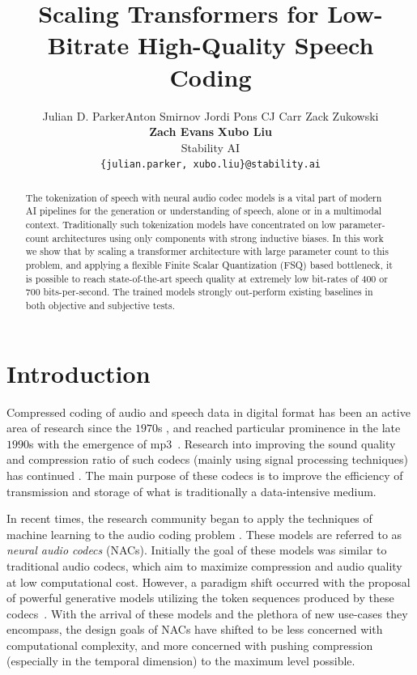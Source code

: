 \documentclass{article} %
\title{Scaling Transformers for Low-Bitrate High-Quality Speech Coding} %
\author{Julian D. Parker\footnotemark[1] \quad Anton Smirnov \quad Jordi Pons \quad CJ Carr \quad Zack Zukowski\\
\textbf{Zach Evans} \quad \textbf{Xubo Liu\footnotemark[1]} \\
Stability AI\\
\texttt{\{julian.parker, xubo.liu\}@stability.ai}\\}
\begin{document}
\maketitle
\renewcommand{\thefootnote}{\fnsymbol{footnote}}
\renewcommand{\thefootnote}{\arabic{footnote}} %
\setcounter{footnote}{0} %
\begin{abstract}
The tokenization of speech with neural audio codec models is a vital part of modern AI pipelines for the generation or understanding of speech, alone or in a multimodal context. Traditionally such tokenization models have concentrated on low parameter-count architectures using only components with strong inductive biases. In this work we show that by scaling a transformer architecture with large parameter count to this problem, and applying a flexible Finite Scalar Quantization (FSQ) based bottleneck, it is possible to reach state-of-the-art speech quality at extremely low bit-rates of $400$ or $700$ bits-per-second. The trained models strongly out-perform existing baselines in both objective and subjective tests.
\end{abstract}

\section{Introduction}
Compressed coding of audio and speech data in digital format has been an active area of research since the $1970$s , and reached particular prominence in the late $1990$s with the emergence of mp3~\citep{Painter2000}. Research into improving the sound quality and compression ratio of such codecs (mainly using signal processing techniques) has continued \citep{valin2016high}. The main purpose of these codecs is to improve the efficiency of transmission and storage of what is traditionally a data-intensive medium.

In recent times, the research community began to apply the techniques of machine learning to the audio coding problem \citep{zeghidour2021soundstream}. These models are referred to as \emph{neural audio codecs} (NACs). %
Initially the goal of these models was similar to traditional audio codecs, which aim to maximize compression and audio quality at low computational cost. However, a paradigm shift occurred with the proposal of powerful generative models utilizing the token sequences produced by these codecs~\citep{borsos2023audiolm, wang2023neural, borsos2023soundstorm}. With the arrival of these models and the plethora of new use-cases they encompass, the design goals of NACs have shifted to be less concerned with computational complexity, and more concerned with pushing compression (especially in the temporal dimension) to the maximum level possible. 
\end{document}
